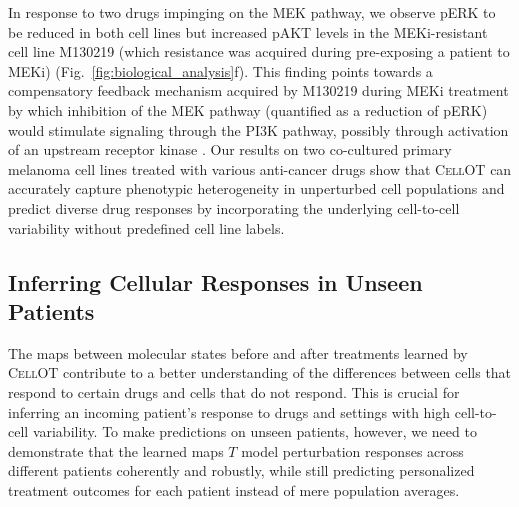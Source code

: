  In response to two drugs impinging on the MEK pathway, we observe pERK to be reduced in both cell lines but increased pAKT levels in the MEKi-resistant cell line M130219 (which resistance was acquired during pre-exposing a patient to MEKi) (Fig.~\ref{fig:biological_analysis}f). This finding points towards a compensatory feedback mechanism acquired by M130219 during MEKi treatment by which inhibition of the MEK pathway (quantified as a reduction of pERK) would stimulate signaling through the PI3K pathway, possibly through activation of an upstream receptor kinase \citep{caunt2015mek1}. 
Our results on two co-cultured primary melanoma cell lines treated with various anti-cancer drugs show that \textsc{CellOT} can accurately capture phenotypic heterogeneity in unperturbed cell populations and predict diverse drug responses by incorporating the underlying cell-to-cell variability without predefined cell line labels. 
    
\subsection{Inferring Cellular Responses in Unseen Patients}
The maps between molecular states before and after treatments learned by \textsc{CellOT} contribute to a better understanding of the differences between cells that respond to certain drugs and cells that do not respond. This is crucial for inferring an incoming patient's response to drugs and settings with high cell-to-cell variability.
To make predictions on unseen patients, however, we need to demonstrate that the learned maps $T$ model perturbation responses across different patients coherently and robustly, while still predicting personalized treatment outcomes for each patient instead of mere population averages.

